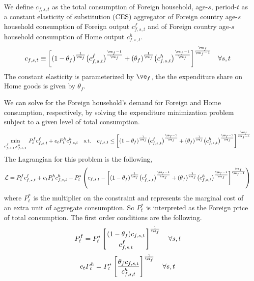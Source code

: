     We define $c_{f,s,t}$ as the total consumption of Foreign household, age-$s$, period-$t$ as a constant elasticity of substitution (CES) aggregator of Foreign country age-$s$ household consumption of Foreign output $c^f_{f,s,t}$ and of Foreign country age-$s$ household consumption of Home output $c^h_{f,s,t}$.
    \begin{equation}\label{EqLgOpenHHcfCES}
      c_{f,s,t}\equiv \biggl[(1 - \theta_f)^\frac{1}{\ve_f}\bigl(c^f_{f,s,t}\bigr)^\frac{\ve_f-1}{\ve_f} + (\theta_f)^\frac{1}{\ve_f}\bigl(c^h_{f,s,t}\bigr)^\frac{\ve_f-1}{\ve_f}\biggr]^\frac{\ve_f}{\ve_f-1} \quad\forall s,t
    \end{equation}
    The constant elasticity is parameterized by $\ve_f$, the the expenditure share on Home goods is given by $\theta_f$.

    We can solve for the Foreign household's demand for Foreign and Home consumption, respectively, by solving the expenditure minimization problem subject to a given level of total consumption.
    \begin{equation}\label{EqLgOpenHHminprobF}
      \min_{c^f_{f,s,t},c^h_{f,s,t}} \: P^f_t c^f_{f,s,t} + e_t P^h_t c^h_{f,s,t} \quad \text{s.t.} \quad c_{f,s,t} \leq \biggl[(1 - \theta_f)^\frac{1}{\ve_f}\bigl(c^f_{f,s,t}\bigr)^\frac{\ve_f-1}{\ve_f} + (\theta_f)^\frac{1}{\ve_f}\bigl(c^h_{f,s,t}\bigr)^\frac{\ve_f-1}{\ve_f}\biggr]^\frac{\ve_f}{\ve_f-1}
    \end{equation}
    The Lagrangian for this problem is the following,
    \begin{equation}\label{EqLgOpenHHlagrF}
      \mathcal{L} = P^f_t c^f_{f,s,t} + e_t P^h_t c^h_{f,s,t} + P^*_t\left(c_{f,s,t} - \biggl[(1 - \theta_f)^\frac{1}{\ve_f}\bigl(c^f_{f,s,t}\bigr)^\frac{\ve_f-1}{\ve_f} + (\theta_f)^\frac{1}{\ve_f}\bigl(c^h_{f,s,t}\bigr)^\frac{\ve_f-1}{\ve_f}\biggr]^\frac{\ve_f}{\ve_f-1}\right)
    \end{equation}
    where $P^*_t$ is the multiplier on the constraint and represents the marginal cost of an extra unit of aggregate consumption. So $P^*_t$ is interpreted as the Foreign price of total consumption. The first order conditions are the following.
    \begin{equation}\label{EqLgOpenHHfocCff}
      P^f_t = P^*_t\left[\frac{(1-\theta_f) c_{f,s,t}}{c^f_{f,s,t}}\right]^{\frac{1}{\ve_f}} \quad\forall s,t
    \end{equation}
    \begin{equation}\label{EqLgOpenHHfocCfh}
      e_t P^h_t = P^*_t\left[\frac{\theta_f c_{f,s,t}}{c^h_{f,s,t}}\right]^{\frac{1}{\ve_f}} \quad\forall s,t
    \end{equation}
